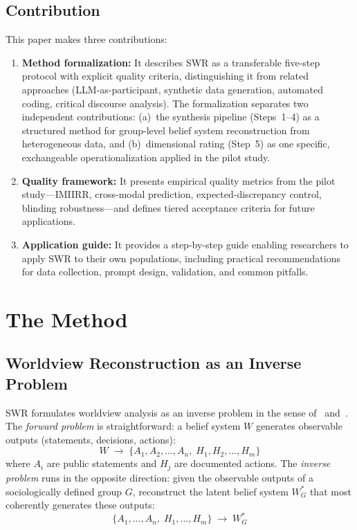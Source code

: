 \documentclass[11pt,a4paper]{article}
\begin{document}
\subsection{Contribution}
\label{sec:intro:contribution}

This paper makes three contributions:

\begin{enumerate}[nosep]
  \item \textbf{Method formalization:} It describes SWR as a transferable five-step protocol with explicit quality criteria, distinguishing it from related approaches (LLM-as-participant, synthetic data generation, automated coding, critical discourse analysis). The formalization separates two independent contributions: (a)~the synthesis pipeline (Steps~1--4) as a structured method for group-level belief system reconstruction from heterogeneous data, and (b)~dimensional rating (Step~5) as one specific, exchangeable operationalization applied in the pilot study.
  \item \textbf{Quality framework:} It presents empirical quality metrics from the pilot study---IMIIRR, cross-modal prediction, expected-discrepancy control, blinding robustness---and defines tiered acceptance criteria for future applications.
  \item \textbf{Application guide:} It provides a step-by-step guide enabling researchers to apply SWR to their own populations, including practical recommendations for data collection, prompt design, validation, and common pitfalls.
\end{enumerate}


\section{The Method}
\label{sec:method}

\subsection{Worldview Reconstruction as an Inverse Problem}
\label{sec:method:inverse}

SWR formulates worldview analysis as an inverse problem in the sense of~\citet{Hadamard1923} and~\citet{Tarantola2005}. The \emph{forward problem} is straightforward: a belief system $W$ generates observable outputs (statements, decisions, actions):
\begin{equation}
  W \;\longrightarrow\; \{A_1, A_2, \ldots, A_n,\; H_1, H_2, \ldots, H_m\}
  \label{eq:forward}
\end{equation}
where $A_i$ are public statements and $H_j$ are documented actions. The \emph{inverse problem} runs in the opposite direction: given the observable outputs of a sociologically defined group $G$, reconstruct the latent belief system $W_G^*$ that most coherently generates these outputs:
\begin{equation}
  \{A_1, \ldots, A_n,\; H_1, \ldots, H_m\} \;\longrightarrow\; W_G^*
  \label{eq:inverse}
\end{equation}
\end{document}

